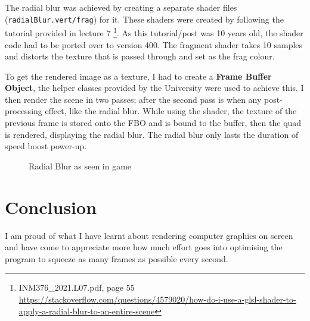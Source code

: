 \documentclass[11pt]{report}
\begin{document}
The radial blur was achieved by creating a separate shader files (\colorbox{mygrey}{\lstinline{radialBlur.vert/frag}}) for it. These shaders were created by following the tutorial provided in lecture 7 \footnote{INM376\_2021.L07.pdf, page 55 \url{https://stackoverflow.com/questions/4579020/how-do-i-use-a-glsl-shader-to-apply-a-radial-blur-to-an-entire-scene}}. As this tutorial/post was 10 years old, the shader code had to be ported over to version 400. The fragment shader takes 10 samples and distorts the texture that is passed through and set as the frag colour.

To get the rendered image as a texture, I had to create a \textbf{Frame Buffer Object}, the helper classes provided by the University were used to achieve this. I then render the scene in two passes; after the second pass is when any post-processing effect, like the radial blur. While using the shader, the texture of the previous frame is stored onto the FBO and is bound to the buffer, then the quad is rendered, displaying the radial blur. The radial blur only lasts the duration of speed boost power-up.
\begin{figure}[H]
    \centering
    \caption{Radial Blur as seen in game}
\end{figure}

\newpage
\section*{Conclusion}
I am proud of what I have learnt about rendering computer graphics on screen and have come to appreciate more how much effort goes into optimising the program to squeeze as many frames as possible every second.
\end{document}

